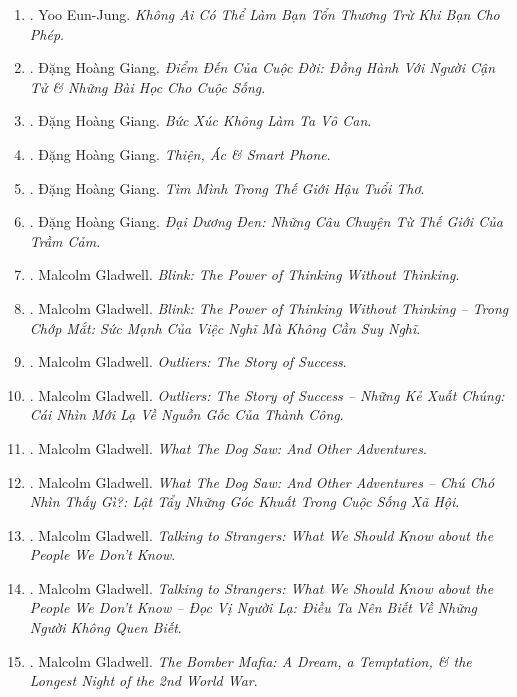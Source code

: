 \documentclass{article}
\begin{document}
\begin{enumerate}
	\item \cite{Eun-Jung2023}. Yoo Eun-Jung. \textit{Không Ai Có Thể Làm Bạn Tổn Thương Trừ Khi Bạn Cho Phép}.\hfill{\sf[done]} 
	\item \cite{Giang2022a}. Đặng Hoàng Giang. \textit{Điểm Đến Của Cuộc Đời: Đồng Hành Với Người Cận Tử \& Những Bài Học Cho Cuộc Sống}.\\\mbox{}\hfill{\sf[done]}
	\item \cite{Giang2022b}. Đặng Hoàng Giang. \textit{Bức Xúc Không Làm Ta Vô Can}.\hfill{\sf[done]}
	\item \cite{Giang2022c}. Đặng Hoàng Giang. \textit{Thiện, Ác \& Smart Phone}.\hfill{\sf[done]}
	\item \cite{Giang2022d}. Đặng Hoàng Giang. \textit{Tìm Mình Trong Thế Giới Hậu Tuổi Thơ}.\hfill{\sf[done]}
	\item \cite{Giang2023}. Đặng Hoàng Giang. \textit{Đại Dương Đen: Những Câu Chuyện Từ Thế Giới Của Trầm Cảm}.\hfill{\sf[done]}
	\item \cite{Gladwell2007}. Malcolm Gladwell. \textit{Blink: The Power of Thinking Without Thinking}.\hfill{\sf[reading]}
	\item \cite{Gladwell_blink}. Malcolm Gladwell. \textit{Blink: The Power of Thinking Without Thinking -- Trong Chớp Mắt: Sức Mạnh Của Việc Nghĩ Mà Không Cần Suy Nghĩ}.\hfill{\sf[done]}
	\item \cite{Gladwell2008}. Malcolm Gladwell. \textit{Outliers: The Story of Success}.\hfill{\sf[reading]}
	\item \cite{Gladwell_outlier}. Malcolm Gladwell. \textit{Outliers: The Story of Success -- Những Kẻ Xuất Chúng: Cái Nhìn Mới Lạ Về Nguồn Gốc Của Thành Công}.\hfill{\sf[done]}
	\item \cite{Gladwell2009}. Malcolm Gladwell. \textit{What The Dog Saw: And Other Adventures}.\hfill{\sf[reading]}
	\item \cite{Gladwell_dog}. Malcolm Gladwell. \textit{What The Dog Saw: And Other Adventures -- Chú Chó Nhìn Thấy Gì?: Lật Tẩy Những Góc Khuất Trong Cuộc Sống Xã Hội}.\hfill{\sf[done]}
	\item \cite{Gladwell2019}. Malcolm Gladwell. \textit{Talking to Strangers: What We Should Know about the People We Don't Know}.\hfill{\sf[reading]}
	\item \cite{Gladwell_stranger}. Malcolm Gladwell. \textit{Talking to Strangers: What We Should Know about the People We Don't Know -- Đọc Vị Người Lạ: Điều Ta Nên Biết Về Những Người Không Quen Biết}.\hfill{\sf[done]}
	\item \cite{Gladwell2021}. Malcolm Gladwell. \textit{The Bomber Mafia: A Dream, a Temptation, \& the Longest Night of the 2nd World War}.\hfill{\sf[reading]}

\end{enumerate}
\end{document}

